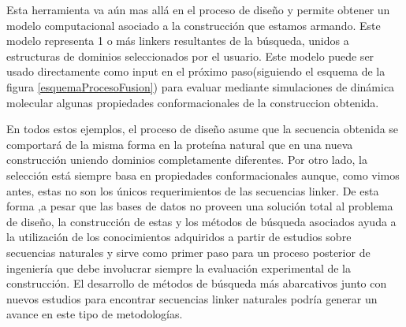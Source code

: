 Esta herramienta va aún mas allá en el proceso de diseño y permite obtener un modelo computacional asociado a la construcción que estamos armando. 
Este modelo representa 1 o más linkers resultantes de la búsqueda, unidos a estructuras de dominios seleccionados por el usuario. 
Este modelo puede ser usado directamente como input en el próximo paso(siguiendo el esquema de la figura \ref{esquemaProcesoFusion}) para evaluar mediante simulaciones 
de dinámica molecular algunas propiedades conformacionales de la construccion obtenida.


En todos estos ejemplos, el proceso de diseño asume que la secuencia obtenida se comportará de la misma forma en la proteína natural que en una nueva construcción uniendo dominios completamente diferentes.
Por otro lado, la selección está siempre basa en propiedades conformacionales aunque, como vimos antes, estas no son los únicos requerimientos de las secuencias linker.
De esta forma ,a pesar que las bases de datos no proveen una solución total al problema de diseño, la construcción de estas y los métodos de búsqueda asociados 
ayuda a la utilización de los conocimientos adquiridos a partir de estudios sobre secuencias naturales y sirve como primer paso para un proceso posterior de ingeniería que debe involucrar siempre la evaluación experimental de la construcción.
El desarrollo de métodos de búsqueda más abarcativos junto con nuevos estudios para encontrar secuencias linker naturales podría generar un avance en este tipo de metodologías.








































